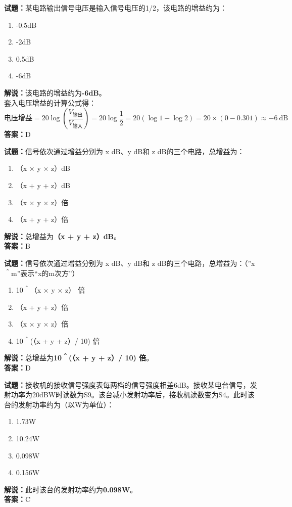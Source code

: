 \documentclass{ctexbook}
\begin{document}
\noindent\textbf{试题：}某电路输出信号电压是输入信号电压的1/2，该电路的增益约为：
\begin{enumerate}[leftmargin=3em]
\item -0.5dB
\item -2dB
\item 0.5dB
\item -6dB
\end{enumerate}
\noindent\textbf{解说：}该电路的增益约为\textbf{-6dB}。\\
套入电压增益的计算公式得：
$$\mbox{电压增益}=20 \log \left( {\frac{V_{ \mbox{输出} }}{V_{ \mbox{输入} }}} \right)=20 \log \frac{1}{2}=20 \left( \log 1 - \log 2 \right) = 20 \times \left( 0 - 0.301 \right) \approx -6 \ \mathrm{dB}$$
\noindent\textbf{答案：}D



\bigskip


\noindent\textbf{试题：}信号依次通过增益分别为 x dB、y dB和 z dB的三个电路，总增益为：
\begin{enumerate}[leftmargin=3em]
\item （x × y × z）dB
\item （x + y + z）dB
\item （x × y × z）倍
\item （x + y + z）倍
\end{enumerate}
\noindent\textbf{解说：}总增益为\textbf{（x + y + z）dB}。\\\noindent\textbf{答案：}B




\bigskip


\noindent\textbf{试题：}信号依次通过增益分别为 x dB、y dB和 z dB的三个电路，总增益为：（”x＾m”表示“x的m次方”）
\begin{enumerate}[leftmargin=3em]
\item 10＾（x × y × z） 倍
\item （x + y + z）倍
\item （x × y × z）倍
\item 10＾(（x + y + z）/ 10) 倍%
\end{enumerate}
\noindent\textbf{解说：}总增益为\textbf{10＾(（x + y + z）/ 10) 倍}。\\\noindent\textbf{答案：}D



\bigskip


\noindent\textbf{试题：}接收机的接收信号强度表每两档的信号强度相差6dB。接收某电台信号，发射功率为20dBW时读数为S9。该台减小发射功率后，接收机读数变为S4。此时该台的发射功率约为（以W为单位）：
\begin{enumerate}[leftmargin=3em]
\item 1.73W
\item 10.24W
\item 0.098W
\item 0.156W
\end{enumerate}
\noindent\textbf{解说：}此时该台的发射功率约为\textbf{0.098W}。\\\noindent\textbf{答案：}C
\end{document}

